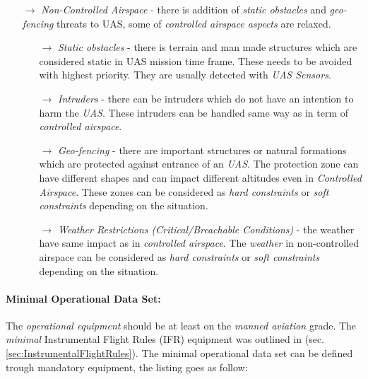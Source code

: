 \begin{itemize}
    \item[$\to$] \emph{Non-Controlled Airspace} - there is addition of \emph{static obstacles} and \emph{geo-fencing} threats to UAS, some of \emph{controlled airspace aspects} are relaxed.
    
    \begin{itemize}
        \item[$\to$] \emph{Static obstacles} - there is terrain and man made structures which are considered static in UAS mission time frame. These needs to be avoided with highest priority. They are usually detected with \emph{UAS Sensors}.
        
        \item[$\to$] \emph{Intruders} - there can be intruders which do not have an intention to harm the \emph{UAS}. These intruders can be handled same way as in term of \emph{controlled airspace}.
        
        \item[$\to$] \emph{Geo-fencing} - there are important structures or natural formations which are protected against entrance of an \emph{UAS}. The protection zone can have different shapes and can impact different altitudes even in \emph{Controlled Airspace}. These zones can be considered as \emph{hard constraints} or \emph{soft constraints} depending on the situation.
        
        \item[$\to$] \emph{Weather Restrictions (Critical/Breachable Conditions)} - the weather have same impact as in \emph{controlled airspace}. The \emph{weather} in non-controlled airspace can be considered as \emph{hard constraints} or \emph{soft constraints} depending on the situation.
    \end{itemize}
\end{itemize}

\paragraph{Minimal Operational Data Set:} The \emph{operational equipment} should be at least on the \emph{manned aviation} grade. The \emph{minimal} Instrumental Flight Rules (IFR) equipment was outlined in (sec. \ref{sec:InstrumentalFlightRules}). The minimal operational data set can be defined trough mandatory equipment, the listing goes as follow:

